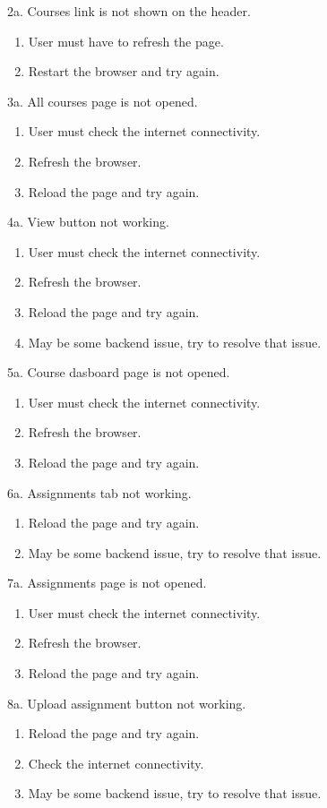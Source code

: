 \documentclass[12pt]{article}
\begin{document}
2a. Courses link is not shown on the header.
\begin{enumerate}
\item User must have to refresh the page.
\item Restart the browser and try again.
\end{enumerate} 
3a. All courses page is not opened.
\begin{enumerate}
\item User must check the internet connectivity.
\item Refresh the browser.
\item Reload the page and try again.
\end{enumerate}
4a. View button not working.
\begin{enumerate}
\item User must check the internet connectivity.
\item Refresh the browser.
\item Reload the page and try again.
\item May be some backend issue, try to resolve that issue.
\end{enumerate}
5a. Course dasboard page is not opened.
\begin{enumerate}
\item User must check the internet connectivity.
\item Refresh the browser.
\item Reload the page and try again.
\end{enumerate}
6a. Assignments tab not working.
\begin{enumerate}
\item Reload the page and try again.
\item May be some backend issue, try to resolve that issue.
\end{enumerate}
7a. Assignments page is not opened.
\begin{enumerate}
\item User must check the internet connectivity.
\item Refresh the browser.
\item Reload the page and try again.
\end{enumerate}
8a. Upload assignment button not working.
\begin{enumerate}
\item Reload the page and try again.
\item Check the internet connectivity.
\item May be some backend issue, try to resolve that issue.
\end{enumerate}
\end{document}
